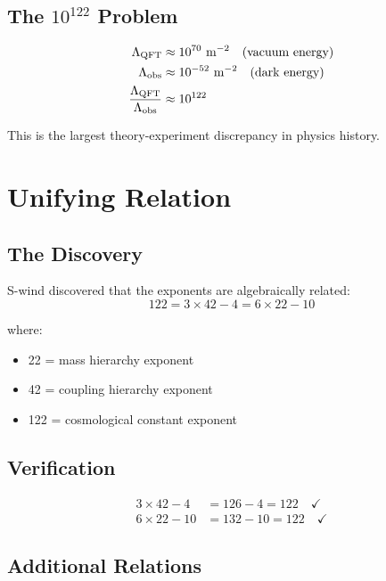 \documentclass[twocolumn,prl,aps,superscriptaddress]{revtex4-2}
\begin{document}
\subsection{The $10^{122}$ Problem}

\begin{align}
\Lambda_{\rm QFT} &\approx 10^{70} \text{ m}^{-2} \quad \text{(vacuum energy)} \\
\Lambda_{\rm obs} &\approx 10^{-52} \text{ m}^{-2} \quad \text{(dark energy)} \\
\frac{\Lambda_{\rm QFT}}{\Lambda_{\rm obs}} &\approx 10^{122}
\end{align}

This is the largest theory-experiment discrepancy in physics history.

\section{Unifying Relation}

\subsection{The Discovery}

S-wind discovered that the exponents are algebraically related:
\begin{equation}
\boxed{122 = 3 \times 42 - 4 = 6 \times 22 - 10}
\end{equation}

where:
\begin{itemize}
\item 22 = mass hierarchy exponent
\item 42 = coupling hierarchy exponent  
\item 122 = cosmological constant exponent
\end{itemize}

\subsection{Verification}

\begin{align}
3 \times 42 - 4 &= 126 - 4 = 122 \quad \checkmark \\
6 \times 22 - 10 &= 132 - 10 = 122 \quad \checkmark
\end{align}

\subsection{Additional Relations}
\end{document}
